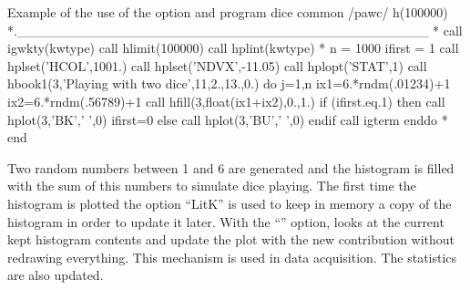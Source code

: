 \newpage

\begin{XMPt}{Example of the use of the option  and }
      program dice
      common /pawc/ h(100000)
*.___________________________________________
*
      call igwkty(kwtype)
      call hlimit(100000)
      call hplint(kwtype)
*
      n      = 1000
      ifirst = 1
      call hplset('HCOL',1001.)
      call hplset('NDVX',-11.05)
      call hplopt('STAT',1)
      call hbook1(3,'Playing with two dice',11,2.,13.,0.)
      do j=1,n
         ix1=6.*rndm(.01234)+1
         ix2=6.*rndm(.56789)+1
         call hfill(3,float(ix1+ix2),0.,1.)
         if (ifirst.eq.1) then
            call hplot(3,'BK',' ',0)
            ifirst=0
         else
            call hplot(3,'BU',' ',0)
         endif
         call igterm
      enddo
*
      end
\end{XMPt}
Two random numbers between 1 and 6 are generated and the histogram is filled 
with the sum of this numbers to simulate dice playing. The first time the 
histogram is plotted the option ``Lit{K}'' is used to keep in memory a copy of 
the histogram in order to update it later. With the ``'' option, 
 looks at the current kept histogram contents and update the plot 
with the new contribution without redrawing everything. This mechanism is used 
in data acquisition. The statistics are also updated.

\newpage



